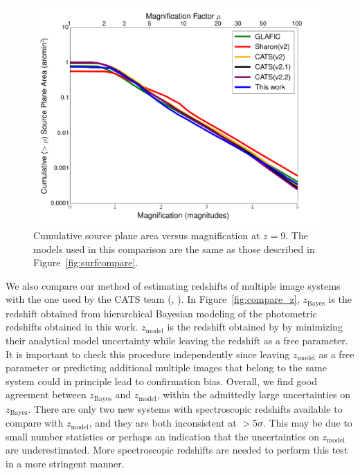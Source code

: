 \begin{figure}
    \centering
    \includegraphics[width=\textwidth]{fig/cumulative_area_arcmin2_A2744.pdf}
    \caption[Cumulative source plane area versus magnification at $z=9$.]{Cumulative source plane area versus magnification at $z=9$. The models used in this comparison are the same as those 
    described in Figure~\ref{fig:surfcompare}.  \label{fig:area}}
\end{figure} 

We also compare our method of estimating redshifts of multiple image
systems with the one used by the CATS team (\citealp{2014MNRAS.444..268R}, \citealp{2014arXiv1409.8663J}). In 
Figure~\ref{fig:compare_z}, $z_{\textrm{Bayes}}$ is the redshift
obtained from hierarchical Bayesian modeling of the photometric
redshifts obtained in this work. $z_{\textrm{model}}$ is the redshift
obtained by \citet{2014arXiv1409.8663J} by minimizing their analytical
model uncertainty while leaving the redshift as a free parameter. It
is important to check this procedure independently since leaving
$z_{\textrm{model}}$ as a free parameter or predicting additional
multiple images that belong to the same system could in principle lead
to confirmation bias. Overall, we find good agreement between
$z_{\textrm{Bayes}}$ and $z_{\textrm{model}}$, within the admittedly
large uncertainties on $z_{\textrm{Bayes}}$. There are only two new
systems with spectroscopic redshifts available to compare with
$z_{\textrm{model}}$, and they are both inconsistent at $>5\sigma$. This may be due to small
number statistics or perhaps an indication that the uncertainties on
$z_{\textrm{model}}$ are underestimated. More spectroscopic redshifts
are needed to perform this test in a more stringent manner.


